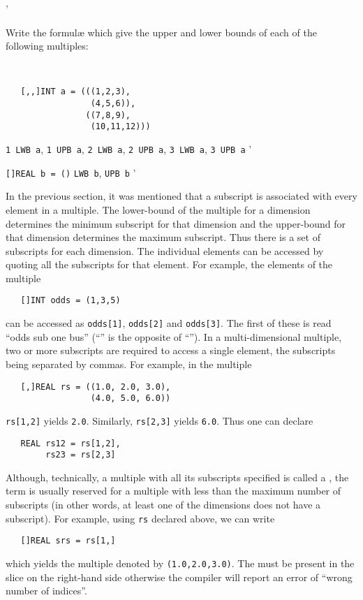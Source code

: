 \begin{exercise}
\begin{subex}
'
\end{subex}
\item Write the formul{\ae} which give the upper and lower bounds of
each of the following multiples:
\begin{subex}
\item \ %
\begin{verbatim}
   [,,]INT a = (((1,2,3),
                 (4,5,6)),
                ((7,8,9),
                 (10,11,12)))
\end{verbatim}
\subans \verb|1 LWB a|, \verb|1 UPB a|, \verb|2 LWB a|,
\verb|2 UPB a|, \verb|3 LWB a|,\newline
\texttt{3 UPB a}
'
\item \verb|[]REAL b = ()| \subans \verb|LWB b|, \verb|UPB b|
'
\end{subex}
\end{exercise}

In the previous section, it was mentioned that a subscript is
associated with every element in a multiple.  The lower-bound of the
multiple for a dimension determines the minimum subscript for that
dimension and the upper-bound for that dimension determines the
maximum subscript.  Thus there is a set of subscripts for each
dimension.  The individual elements can be accessed by quoting all
the subscripts for that element. For example, the elements of the
multiple
\begin{verbatim}
   []INT odds = (1,3,5)
\end{verbatim}
\noindent
can be accessed as \verb|odds[1]|, \verb|odds[2]| and \verb|odds[3]|.
The first of these is read ``odds sub one bus'' (``'' is the opposite
of ``'').  In a multi-dimensional multiple, two or more subscripts are
required to access a single element, the subscripts being separated
by commas.  For example, in the multiple
\begin{verbatim}
   [,]REAL rs = ((1.0, 2.0, 3.0),
                 (4.0, 5.0, 6.0))
\end{verbatim}
\noindent
\verb|rs[1,2]| yields \verb|2.0|.  Similarly, \verb|rs[2,3]| yields
\verb|6.0|.  Thus one can declare
\begin{verbatim}
   REAL rs12 = rs[1,2],
        rs23 = rs[2,3]
\end{verbatim}

Although, technically, a multiple with all its subscripts specified
is called a , the term is usually reserved for a multiple
with less than the maximum number of subscripts (in other words, at
least one of the dimensions does not have a subscript).  For example,
using \verb|rs| declared above, we can write
\begin{verbatim}
   []REAL srs = rs[1,]
\end{verbatim}
\noindent
which yields the multiple denoted by \verb|(1.0,2.0,3.0)|.
The  must be present in the slice on the right-hand side
otherwise the compiler will report an error of ``wrong number of
indices''.

